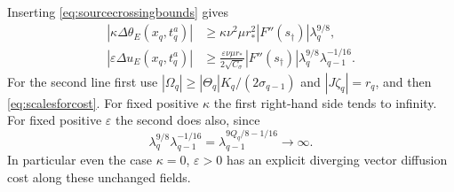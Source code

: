 Inserting \eqref{eq:sourcecrossingbounds} gives
\begin{align}
 |\kappa\Delta\theta_E(x_q,t_q^a)|
 &\geq\kappa\nu^2\mu r_*^2
 |F''(s_\dagger)|\lambda_q^{9/8},\label{eq:scalarcostlower}\\
 |\varepsilon\Delta u_E(x_q,t_q^a)|
 &\geq\frac{\varepsilon\nu\mu r_*}{2\sqrt{C_\sigma}}
 |F''(s_\dagger)|\lambda_q^{9/8}
 \lambda_{q-1}^{-1/16}.
 \label{eq:velocitycostlower}
\end{align}
For the second line first use
$|\Omega_q|\geq |\Theta_q|K_q/(2\sigma_{q-1})$ and
$|J\zeta_q|=r_q$, and then \eqref{eq:scalesforcost}.
For fixed positive $\kappa$ the first right-hand side tends
to infinity. For fixed positive $\varepsilon$ the second
does also, since
\[
 \lambda_q^{9/8}\lambda_{q-1}^{-1/16}
 =\lambda_{q-1}^{9Q_q/8-1/16}\longrightarrow\infty.
\]
In particular even the case $\kappa=0$, $\varepsilon>0$
has an explicit diverging vector diffusion cost along these
unchanged fields.

